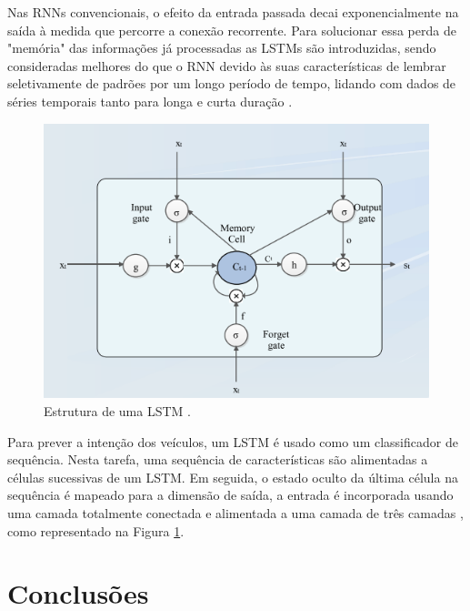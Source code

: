 
Nas RNNs convencionais, o efeito da entrada passada decai exponencialmente na saída à medida que percorre a conexão recorrente. Para solucionar essa perda de "memória" das informações já processadas as LSTMs são introduzidas, sendo consideradas melhores do que o RNN devido às suas características de lembrar seletivamente de padrões por um longo período de tempo, lidando com dados de séries temporais tanto para longa e curta duração \cite{software-cnn}.

\begin{figure}[H]
\centering
\includegraphics[width=\textwidth]{Figures/LSTM.png}
\caption{Estrutura de uma LSTM \cite{software-cnn}.}
\label{LSTM}
\end{figure}



Para prever a intenção dos veículos, um LSTM é usado como um classificador de sequência. Nesta tarefa, uma sequência de características são alimentadas a células sucessivas de um LSTM. Em seguida, o estado oculto da última célula na sequência é mapeado para a dimensão de saída, a entrada é incorporada usando uma camada totalmente conectada e alimentada a uma camada de três camadas \cite{software-review}, como representado na Figura \ref{LSTM}.



\chapter{Conclusões} \label{concl}

